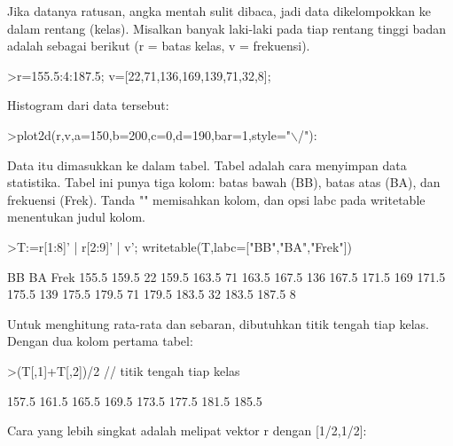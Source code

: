 \documentclass[a4paper,10pt]{article}
\begin{document}
\begin{eulernotebook}
\begin{eulercomment}
\begin{eulercomment}
\begin{eulercomment}
\begin{eulercomment}
\begin{eulercomment}
\begin{eulercomment}
\begin{eulercomment}
\end{eulercomment}
\begin{eulercomment}
Jika datanya ratusan, angka mentah sulit dibaca, jadi data dikelompokkan ke dalam
rentang (kelas). Misalkan banyak laki-laki pada tiap rentang tinggi badan adalah sebagai
berikut (r = batas kelas, v = frekuensi).
\end{eulercomment}
\begin{eulerprompt}
>r=155.5:4:187.5; v=[22,71,136,169,139,71,32,8];
\end{eulerprompt}
\begin{eulercomment}
Histogram dari data tersebut:
\end{eulercomment}
\begin{eulerprompt}
>plot2d(r,v,a=150,b=200,c=0,d=190,bar=1,style="\(\backslash\)/"):
\end{eulerprompt}
\begin{eulercomment}
Data itu dimasukkan ke dalam tabel. Tabel adalah cara menyimpan data statistika. Tabel ini
punya tiga kolom: batas bawah (BB), batas atas (BA), dan frekuensi (Frek). Tanda "\textbar{}"
memisahkan kolom, dan opsi labc pada writetable menentukan judul kolom.
\end{eulercomment}
\begin{eulerprompt}
>T:=r[1:8]' | r[2:9]' | v'; writetable(T,labc=["BB","BA","Frek"])
\end{eulerprompt}
\begin{euleroutput}
          BB        BA      Frek
       155.5     159.5        22
       159.5     163.5        71
       163.5     167.5       136
       167.5     171.5       169
       171.5     175.5       139
       175.5     179.5        71
       179.5     183.5        32
       183.5     187.5         8
\end{euleroutput}
\begin{eulercomment}
Untuk menghitung rata-rata dan sebaran, dibutuhkan titik tengah tiap kelas. Dengan dua
kolom pertama tabel:
\end{eulercomment}
\begin{eulerprompt}
>(T[,1]+T[,2])/2 // titik tengah tiap kelas
\end{eulerprompt}
\begin{euleroutput}
      157.5 
      161.5 
      165.5 
      169.5 
      173.5 
      177.5 
      181.5 
      185.5 
\end{euleroutput}
\begin{eulercomment}
Cara yang lebih singkat adalah melipat vektor r dengan [1/2,1/2]:

\end{eulercomment}
\end{eulercomment}
\end{eulercomment}
\end{eulercomment}
\end{eulercomment}
\end{eulercomment}
\end{eulercomment}
\end{eulernotebook}
\end{document}
